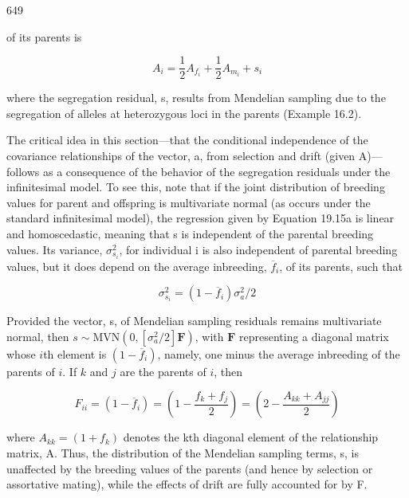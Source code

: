\documentclass{article}
\begin{document}
649

of its parents is

\begin{equation}
A_{i}=\frac{1}{2}A_{f_{i}}+\frac{1}{2}A_{m_{i}}+s_{i}
\tag{19.15a}
\label{eq:19_15a}
\end{equation}

where the segregation residual, s, results from Mendelian sampling due to the segregation of alleles at heterozygous loci in the parents (Example 16.2).

The critical idea in this section—that the conditional independence of the covariance relationships of the vector, a, from selection and drift (given A)—follows as a consequence of the behavior of the segregation residuals under the infinitesimal model. To see this, note that if the joint distribution of breeding values for parent and offspring is multivariate normal (as occurs under the standard infinitesimal model), the regression given by Equation 19.15a is linear and homoscedastic, meaning that s is independent of the parental breeding values. Its variance,  $ \sigma_{s_i}^2 $, for individual i is also independent of parental breeding values, but it does depend on the average inbreeding,  $ \overline{f}_i $, of its parents, such that

\begin{equation}
\sigma_{s_{i}}^{2}=\left(1-\overline{f}_{i}\right)\sigma_{a}^{2}/2
\tag{19.15b}
\label{eq:19_15b}
\end{equation}

Provided the vector, s, of Mendelian sampling residuals remains multivariate normal, then  $ s \sim \text{MVN}(0, [\sigma_a^2/2] \mathbf{F}) $, with  $ \mathbf{F} $ representing a diagonal matrix whose  $ i $th element is  $ (1 - \overline{f}_i) $, namely, one minus the average inbreeding of the parents of  $ i $. If  $ k $ and  $ j $ are the parents of  $ i $, then

\begin{equation}
F_{ii}=\left(1-\overline{f}_{i}\right)=\left(1-\frac{f_{k}+f_{j}}{2}\right)=\left(2-\frac{A_{kk}+A_{jj}}{2}\right)
\tag{19.16}
\label{eq:19_16}
\end{equation}

where  $ A_{kk} = (1 + f_k) $ denotes the kth diagonal element of the relationship matrix, A. Thus, the distribution of the Mendelian sampling terms, s, is unaffected by the breeding values of the parents (and hence by selection or assortative mating), while the effects of drift are fully accounted for by F.
\end{document}
